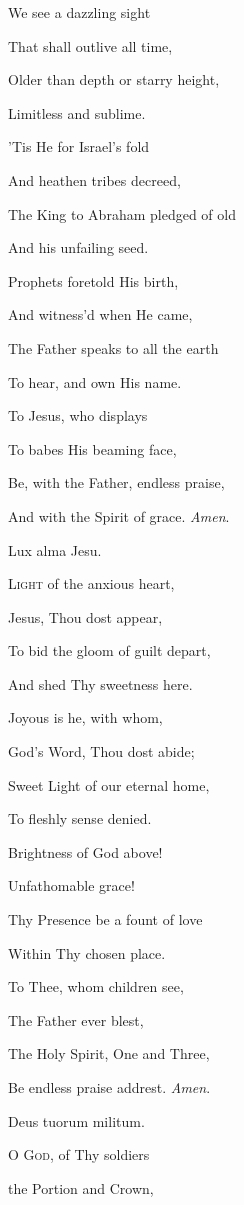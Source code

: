 We see a dazzling sight

That shall outlive all
time,

Older than depth or starry height,

Limitless and sublime.

'Tis He for Israel's fold

And heathen tribes
decreed,

The King to Abraham pledged of old

And his unfailing seed.

Prophets foretold His birth,

And witness'd when He came,

The Father speaks to all the earth

To hear, and own His name.

To Jesus, who displays

To babes His beaming face,

Be, with the Father, endless praise,

And with the Spirit of
grace. \emph{Amen}.


Lux alma Jesu.

L\textsc{ight} of the anxious heart,

Jesus, Thou dost appear,

To bid the gloom of guilt depart,

And shed Thy sweetness here.

Joyous is he, with whom,

God's Word, Thou dost abide;

Sweet Light of our eternal home,

To fleshly sense denied.

Brightness of God above!

Unfathomable grace!

Thy Presence be a fount of love

Within Thy chosen place. 

To Thee, whom children see,

The Father ever blest,

The Holy Spirit, One and Three,

Be endless praise addrest. \emph{Amen}.


Deus tuorum militum.

O G\textsc{od}, of Thy soldiers

the Portion and Crown,

